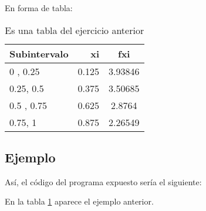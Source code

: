 \documentclass[spanish,a4paper,11pt]{article}
\begin{document}
En forma de tabla:\\
\begin{table}[!h]
\begin{tabular}{lrc}
Subintervalo & xi & fxi\\
\hline
0 , 0.25 & 0.125 & 3.93846\\
0.25, 0.5  & 0.375 & 3.50685\\
0.5 , 0.75 & 0.625 & 2.8764\\
0.75, 1  & 0.875 & 2.26549
\end{tabular}
\caption{Es una tabla del ejercicio anterior}
\label{Mitabla}
\end{table}


\subsection{Ejemplo}

Así, el código del programa expuesto sería el siguiente:


En la tabla \ref{Mitabla} aparece el ejemplo anterior.


\end{document}
